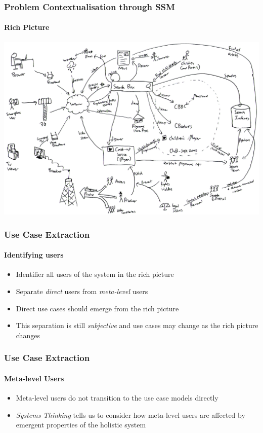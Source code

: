 \documentclass{beamer}
\begin{document}
\begin{frame}
  \frametitle{Problem Contextualisation through SSM}
  \framesubtitle{Rich Picture}
  \includegraphics[width=\linewidth]{rich-picture.png}
\end{frame}

\begin{frame}
  \frametitle{Use Case Extraction}
  \framesubtitle{Identifying users}
  \begin{itemize}
    \pause \item Identifier all users of the system in the rich picture
    \pause \item Separate \emph{direct} users from \emph{meta-level} users
    \pause \item Direct use cases should emerge from the rich picture
    \pause \item This separation is still \emph{subjective} and use cases may change as the rich picture changes
  \end{itemize}
\end{frame}

\begin{frame}
  \frametitle{Use Case Extraction}
  \framesubtitle{Meta-level Users}
  \begin{itemize}
    \pause \item Meta-level users do not transition to the use case models directly
    \pause \item \emph{Systems Thinking} tells us to consider how meta-level users are affected by emergent properties of the holistic system
  \end{itemize}
\end{frame}
\end{document}
